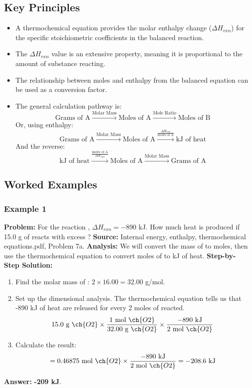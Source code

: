 \documentclass{article}
\begin{document}
\subsection{Key Principles}
\begin{itemize}
    \item A thermochemical equation provides the molar enthalpy change ($\Delta H_{rxn}$) for the specific stoichiometric coefficients in the balanced reaction.
    \item The $\Delta H_{rxn}$ value is an extensive property, meaning it is proportional to the amount of substance reacting.
    \item The relationship between moles and enthalpy from the balanced equation can be used as a conversion factor.
    \item The general calculation pathway is:
    \[ \text{Grams of A} \xrightarrow{\text{Molar Mass}} \text{Moles of A} \xrightarrow{\text{Mole Ratio}} \text{Moles of B} \]
    Or, using enthalpy:
    \[ \text{Grams of A} \xrightarrow{\text{Molar Mass}} \text{Moles of A} \xrightarrow{\frac{\Delta H_{rxn}}{\text{moles of A}}} \text{kJ of heat} \]
    And the reverse:
    \[ \text{kJ of heat} \xrightarrow{\frac{\text{moles of A}}{\Delta H_{rxn}}} \text{Moles of A} \xrightarrow{\text{Molar Mass}} \text{Grams of A} \]
\end{itemize}

\subsection{Worked Examples}
\subsubsection{Example 1}
\textbf{Problem:} For the reaction , $\Delta H_{rxn} = -890$ kJ. How much heat is produced if 15.0 g of  reacts with excess ?
\textbf{Source:} Internal energy, enthalpy, thermochemical equations.pdf, Problem 7a.
\textbf{Analysis:} We will convert the mass of  to moles, then use the thermochemical equation to convert moles of  to kJ of heat.
\textbf{Step-by-Step Solution:}
\begin{enumerate}
    \item Find the molar mass of : $2 \times 16.00 = 32.00$ g/mol.
    \item Set up the dimensional analysis. The thermochemical equation tells us that -890 kJ of heat are released for every 2 moles of  reacted.
    \[ 15.0 \text{ g } \ch{O2} \times \frac{1 \text{ mol } \ch{O2}}{32.00 \text{ g } \ch{O2}} \times \frac{-890 \text{ kJ}}{2 \text{ mol } \ch{O2}} \]
    \item Calculate the result:
    \[ = 0.46875 \text{ mol } \ch{O2} \times \frac{-890 \text{ kJ}}{2 \text{ mol } \ch{O2}} = -208.6 \text{ kJ} \]
\end{enumerate}
\textbf{Answer:} \textbf{-209 kJ}.
\end{document}
